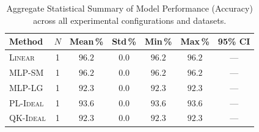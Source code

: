 \begin{table}[ht]
\centering
\caption{Aggregate Statistical Summary of Model Performance (Accuracy) across all experimental configurations and datasets.}
\label{tab:stat_summary}
\begin{tabular}{lcccccc}
\toprule
\textbf{Method} & $N$ & \textbf{Mean\,\%} & \textbf{Std\,\%} & \textbf{Min\,\%} & \textbf{Max\,\%} & \textbf{95\% CI} \\
\midrule
\textsc{Linear} & 1 & $96.2$ & $0.0$ & $96.2$ & $96.2$ & — \\
\textsc{MLP-SM} & 1 & $96.2$ & $0.0$ & $96.2$ & $96.2$ & — \\
\textsc{MLP-LG} & 1 & $92.3$ & $0.0$ & $92.3$ & $92.3$ & — \\
\textsc{PL-Ideal} & 1 & $93.6$ & $0.0$ & $93.6$ & $93.6$ & — \\
\textsc{QK-Ideal} & 1 & $92.3$ & $0.0$ & $92.3$ & $92.3$ & — \\
\bottomrule
\end{tabular}
\end{table}
